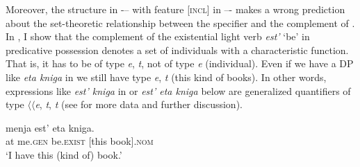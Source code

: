 \documentclass[output=paper,colorlinks,citecolor=brown,nonflat]{./langscibook}
\begin{document}
Moreover, the structure in  -– with feature [\textsc{incl}] in \liv –- makes a wrong prediction about the set-theoretic relationship between the specifier and the complement of \liv . In \citet{TsedrykInPress}, I show that the complement of the existential light verb \textit{est’} ‘be’ in predicative possession denotes a set of individuals with a characteristic function. That is, it has to be of type {\textlangle}\textit{e}, \textit{t}{\textrangle}, not of type {\textlangle}\textit{e}{\textrangle} (individual). Even if we have a DP like \textit{eta kniga} in  we still have type {\textlangle}\textit{e}, \textit{t}{\textrangle} (this kind of books). In other words, expressions like \textit{est’ kniga} in  or \textit{est’ eta kniga} below are generalized quantifiers of type ${\langle}{\langle}$\textit{e}, \textit{t}{\textrangle}, \textit{t}{\textrangle} (see \citealt{TsedrykInPress} for more data and further discussion). 

\ea%
    \label{ex:tsedryk:9}
     {menja}     {est’}           {eta} {kniga.}\\
            at me.\textsc{gen}   be.\textsc{exist}   [this book].\textsc{nom}\\
    \glt    ‘I have this (kind of) book.’
    \z
\end{document}

